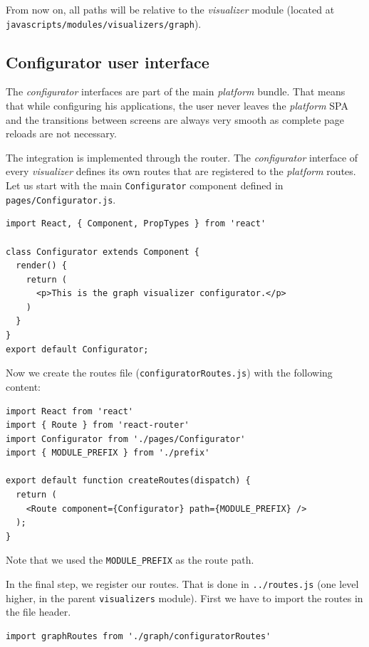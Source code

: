 From now on, all paths will be relative to the \emph{visualizer} module (located at \texttt{javascripts/modules/visualizers/graph}).

\subsection{Configurator user interface}
\label{sec:implementation:integrating-visualizer:configurator}

The \emph{configurator} interfaces are part of the main \emph{platform} bundle. That means that while configuring his applications, the user never leaves the \emph{platform} SPA and the transitions between screens are always very smooth as complete page reloads are not necessary.

The integration is implemented through the router. The \emph{configurator} interface of every \emph{visualizer} defines its own routes that are registered to the \emph{platform} routes. Let us start with the main \texttt{Configurator} component defined in \texttt{pages/Configurator.js}.

\begin{verbatim}
import React, { Component, PropTypes } from 'react'

class Configurator extends Component {
  render() {
    return (
      <p>This is the graph visualizer configurator.</p>
    )
  }
}
export default Configurator;
\end{verbatim}

Now we create the routes file (\texttt{configuratorRoutes.js}) with the following content:

\begin{verbatim}
import React from 'react'
import { Route } from 'react-router'
import Configurator from './pages/Configurator'
import { MODULE_PREFIX } from './prefix'

export default function createRoutes(dispatch) {
  return (
    <Route component={Configurator} path={MODULE_PREFIX} />
  );
}
\end{verbatim}

Note that we used the \texttt{MODULE\_PREFIX} as the route path.

In the final step, we register our routes. That is done in \texttt{../routes.js} (one level higher, in the parent \texttt{visualizers} module). First we have to import the routes in the file header.

\begin{verbatim}
import graphRoutes from './graph/configuratorRoutes'
\end{verbatim}


